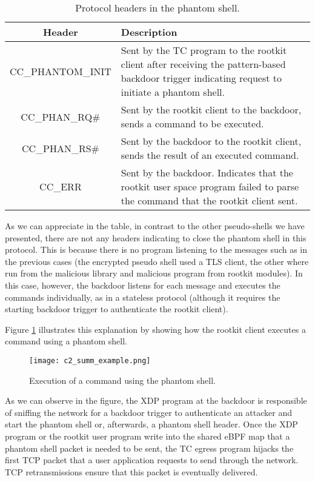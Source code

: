\begin{table}[htbp]
\begin{tabular}{|c|>{\centering\arraybackslash}p{8cm}|}
\hline
\textbf{Header} & \textbf{Description}\\
\hline
\hline
CC\_PHANTOM\_INIT & Sent by the TC program to the rootkit client after receiving the pattern-based backdoor trigger indicating request to initiate a phantom shell.\\
\hline
CC\_PHAN\_RQ\# & Sent by the rootkit client to the backdoor, sends a command to be executed.\\
\hline
CC\_PHAN\_RS\# & Sent by the backdoor to the rootkit client, sends the result of an executed command.\\
\hline
CC\_ERR & Sent by the backdoor. Indicates that the rootkit user space program failed to parse the command that the rootkit client sent.\\
\hline
\end{tabular}
\caption{Protocol headers in the phantom shell.}
\label{table:phantom_headers}
\end{table}

As we can appreciate in the table, in contrast to the other pseudo-shells we have presented, there are not any headers indicating to close the phantom shell in this protocol. This is because there is no program listening to the messages such as in the previous cases (the encrypted pseudo shell used a TLS client, the other where run from the malicious library and malicious program from rootkit modules). In this case, however, the backdoor listens for each message and executes the commands individually, as in a stateless protocol (although it requires the starting backdoor trigger to authenticate the rootkit client).

Figure \ref{fig:c2_summ_example} illustrates this explanation by showing how the rootkit client executes a command using a phantom shell.

\begin{figure}[htbp]
	\centering
	\texttt{[image: c2\_summ\_example.png]}
	\caption{Execution of a command using the phantom shell.}
	\label{fig:c2_summ_example}
\end{figure}

As we can observe in the figure, the XDP program at the backdoor is responsible of sniffing the network for a backdoor trigger to authenticate an attacker and start the phantom shell or, afterwards, a phantom shell header. Once the XDP program or the rootkit user program write into the shared eBPF map that a phantom shell packet is needed to be sent, the TC egress program hijacks the first TCP packet that a user application requests to send through the network. TCP retransmissions ensure that this packet is eventually delivered.

